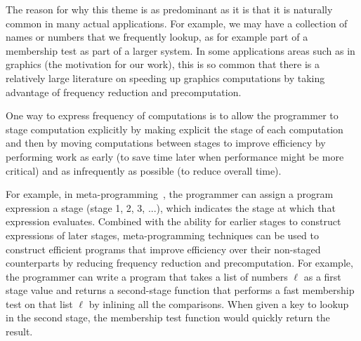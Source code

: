 The reason for why this theme is as predominant as it is that it is
naturally common in many actual applications.  For example, we may
have a collection of names or numbers that we frequently lookup, as
for example part of a membership test as part of a larger system.  In
some applications areas such as in graphics (the motivation for our
work), this is so common that there is a relatively large literature
on speeding up graphics computations by taking advantage of frequency
reduction and precomputation.

One way to express frequency of computations is to allow the
programmer to stage computation explicitly by making explicit the
stage of each computation and then by moving computations between
stages to improve efficiency by performing work as early (to save time
later when performance might be more critical) and  as infrequently
as possible (to reduce overall time).






For example, in meta-programming~\cite{}, the programmer can assign a
program expression a stage (stage 1, 2, 3, ...), which indicates the
stage at which that expression evaluates.  Combined with the ability
for earlier stages to construct expressions of later stages,
meta-programming techniques can be used to construct efficient
programs that improve efficiency over their non-staged counterparts by
reducing frequency reduction and precomputation.  For example, the
programmer can write a program that takes a list of numbers $\ell$ as
a first stage value and returns a second-stage function that performs
a fast membership test on that list $\ell$ by inlining all the
comparisons.  When given a key to lookup in the second stage, the
membership test function would quickly return the result.




